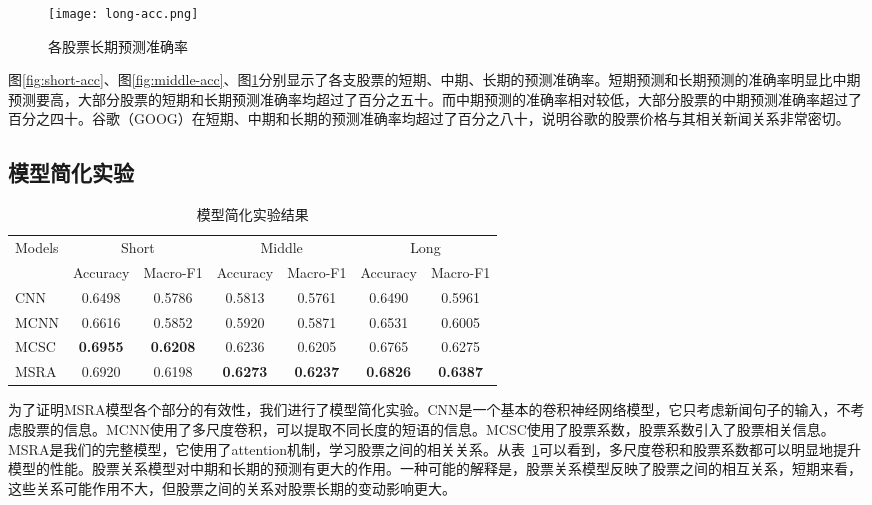 \begin{figure}[H]
    \centering 
    \texttt{[image: long-acc.png]}
    \caption{各股票长期预测准确率}
    \label{fig:long-acc}
\end{figure}
图\ref{fig:short-acc}、图\ref{fig:middle-acc}、图\ref{fig:long-acc}分别显示了各支股票的短期、中期、长期的预测准确率。短期预测和长期预测的准确率明显比中期预测要高，大部分股票的短期和长期预测准确率均超过了百分之五十。而中期预测的准确率相对较低，大部分股票的中期预测准确率超过了百分之四十。谷歌（GOOG）在短期、中期和长期的预测准确率均超过了百分之八十，说明谷歌的股票价格与其相关新闻关系非常密切。
\subsection{模型简化实验}

\begin{table}[ht]
    \centering
    \caption{模型简化实验结果}
    \label{tab:ablation}
    \begin{tabular}{lcccccc}
    \hline
    \multirow{2}{*}{Models} & \multicolumn{2}{c}{Short}         & \multicolumn{2}{c}{Middle}        & \multicolumn{2}{c}{Long}                                \\ \cline{2-7} 
                            & Accuracy        & Macro-F1        & Accuracy        & Macro-F1        & Accuracy                   & Macro-F1                   \\ \hline
    CNN                     & 0.6498          & 0.5786          & 0.5813          & 0.5761          & \multicolumn{1}{c}{0.6490} & \multicolumn{1}{c}{0.5961} \\
    MCNN                    & 0.6616          & 0.5852          & 0.5920          & 0.5871          & \multicolumn{1}{c}{0.6531} & \multicolumn{1}{c}{0.6005} \\
    MCSC                    & \textbf{0.6955} & \textbf{0.6208} & 0.6236          & 0.6205          & 0.6765                            & 0.6275                     \\ 
    MSRA                    & 0.6920          & 0.6198          & \textbf{0.6273} & \textbf{0.6237} & \textbf{0.6826}                   & \textbf{0.6387}            \\ \hline
    \end{tabular}
\end{table}
为了证明MSRA模型各个部分的有效性，我们进行了模型简化实验。CNN是一个基本的卷积神经网络模型，它只考虑新闻句子的输入，不考虑股票的信息。MCNN使用了多尺度卷积，可以提取不同长度的短语的信息。MCSC使用了股票系数，股票系数引入了股票相关信息。MSRA是我们的完整模型，它使用了attention机制，学习股票之间的相关关系。从表~\ref{tab:ablation}可以看到，多尺度卷积和股票系数都可以明显地提升模型的性能。股票关系模型对中期和长期的预测有更大的作用。一种可能的解释是，股票关系模型反映了股票之间的相互关系，短期来看，这些关系可能作用不大，但股票之间的关系对股票长期的变动影响更大。

